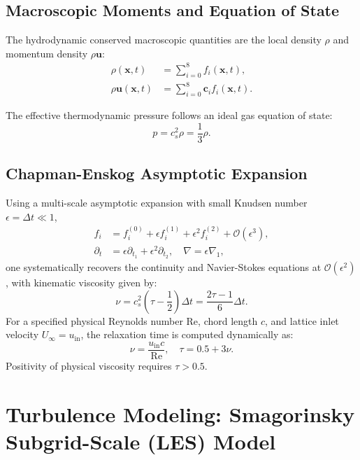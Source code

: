 \documentclass[11pt,a4paper]{article}
\begin{document}
\subsection{Macroscopic Moments and Equation of State}
The hydrodynamic conserved macroscopic quantities are the local density $\rho$ and momentum density $\rho \mathbf{u}$:
\begin{align}
\rho(\mathbf{x}, t) &= \sum_{i=0}^8 f_i(\mathbf{x}, t), \\
\rho \mathbf{u}(\mathbf{x}, t) &= \sum_{i=0}^8 \mathbf{c}_i f_i(\mathbf{x}, t).
\end{align}

The effective thermodynamic pressure follows an ideal gas equation of state:
\begin{equation}
p = c_s^2 \rho = \frac{1}{3} \rho.
\end{equation}

\subsection{Chapman-Enskog Asymptotic Expansion}
Using a multi-scale asymptotic expansion with small Knudsen number $\epsilon = \Delta t \ll 1$,
\begin{align}
f_i &= f_i^{(0)} + \epsilon f_i^{(1)} + \epsilon^2 f_i^{(2)} + \mathcal{O}(\epsilon^3), \\
\partial_t &= \epsilon \partial_{t_1} + \epsilon^2 \partial_{t_2}, \quad \nabla = \epsilon \nabla_1,
\end{align}
one systematically recovers the continuity and Navier-Stokes equations at $\mathcal{O}(\epsilon^2)$, with kinematic viscosity given by:
\begin{equation}
\nu = c_s^2 \left( \tau - \frac{1}{2} \right) \Delta t = \frac{2\tau - 1}{6} \Delta t.
\end{equation}
For a specified physical Reynolds number $\mathrm{Re}$, chord length $c$, and lattice inlet velocity $U_\infty = u_{\text{in}}$, the relaxation time is computed dynamically as:
\begin{equation}
\nu = \frac{u_{\text{in}} c}{\mathrm{Re}}, \quad \tau = 0.5 + 3\nu.
\end{equation}
Positivity of physical viscosity requires $\tau > 0.5$.

\section{Turbulence Modeling: Smagorinsky Subgrid-Scale (LES) Model}
\end{document}
